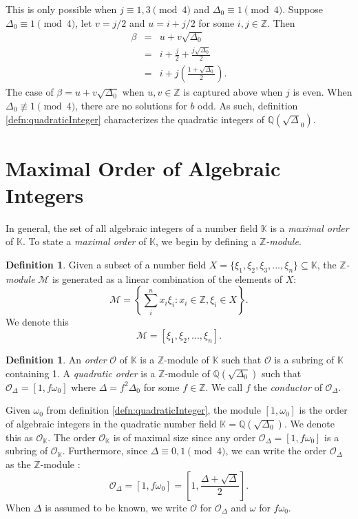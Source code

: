 \documentclass{ucalgthes1}
\theoremstyle{plain}
\theoremstyle{definition}
\newtheorem{defn}[thm]{Definition}
\newcommand{\KK}{\mathbb{K}}
\newcommand{\MM}{\mathcal{M}}
\newcommand{\OO}{\mathcal{O}}
\newcommand{\ZZ}{\mathbb{Z}}
\newcommand{\QQ}{\mathbb{Q}}
\begin{document}
\noindent
This is only possible when $j \equiv 1,3 \pmod 4$ and $\Delta_0 \equiv 1 \pmod 4$.  Suppose \break $\Delta_0 \equiv 1 \pmod 4$, let $v = j/2$ and $u = i + j/2$ for some $i, j \in \ZZ$.  Then
\begin{eqnarray*}
	\beta & = & u + v \sqrt{\Delta_0} \\
	& = & i + \frac{j}{2} + \frac{j \sqrt{\Delta_0}}{2} \\
	& = & i + j \left( \frac{1 + \sqrt{\Delta_0}}{2} \right).
\end{eqnarray*}
The case of $\beta = u + v \sqrt{\Delta_0}$ when $u,v \in \ZZ$ is captured above when $j$ is even. When $\Delta_0 \not \equiv 1 \pmod 4$, there are no solutions for $b$ odd.  As such, definition \ref{defn:quadraticInteger} characterizes the quadratic integers of $\QQ(\sqrt\Delta_0)$.



\bigbreak
\section{Maximal Order of Algebraic Integers}
In general, the set of all algebraic integers of a number field $\KK$ is a \emph{maximal order} of $\KK$.  To state a \emph{maximal order} of $\KK$, we begin by defining a \emph{$\ZZ$-module}.  

\begin{defn}
Given a subset of a number field $X = \{ \xi_1, \xi_2, \xi_3, ..., \xi_n \} \subseteq \KK$, the \emph{$\ZZ$-module} $\MM$ is generated as a linear combination of the elements of $X$:
\[
	\MM = \left \{ \sum_{i}^n x_i \xi_i : x_i \in \ZZ, \xi_i \in X \right \}.
\]
We denote this
\[
	\MM = [ \xi_1, \xi_2, ..., \xi_n ].
\]
\end{defn}

\begin{defn}
An \emph{order} $\OO$ of $\KK$ is a $\ZZ$-module of $\KK$ such that $\OO$ is a subring of $\KK$ containing 1.  A \emph{quadratic order} is a $\ZZ$-module of $\QQ(\sqrt{\Delta_0})$ such that $\OO_\Delta = [1, f\omega_0]$ where $\Delta = f^2\Delta_0$ for some $f \in \ZZ$.  We call $f$ the \emph{conductor} of $\OO_\Delta$.
\end{defn}

\bigbreak
Given $\omega_0$ from definition \ref{defn:quadraticInteger}, the module $[1, \omega_0]$ is the order of algebraic integers in the quadratic number field $\KK=\QQ(\sqrt{\Delta_0})$.  We denote this as $\OO_{\KK}$.  The order $\OO_\KK$ is of maximal size since any order $\OO_\Delta = [1,f\omega_0]$ is a subring of $\OO_\KK$.  Furthermore, since $\Delta \equiv 0,1 \pmod 4$, we can write the order $\OO_\Delta$ as the $\ZZ$-module \cite[p.~81]{Jac09}:
\begin{equation*}
	\OO_\Delta = [1,f\omega_0] = \left[1, \frac{\Delta + \sqrt{\Delta}}{2} \right].
\end{equation*}
When $\Delta$ is assumed to be known, we write $\OO$ for $\OO_\Delta$ and $\omega$ for $f\omega_0$.
\end{document}
